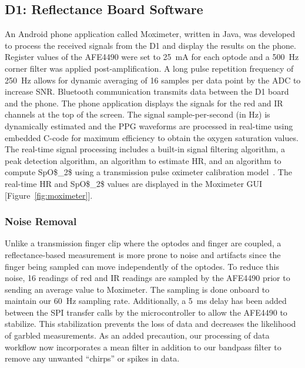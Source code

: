\subsection{D1: Reflectance Board Software}
An Android phone application called Moximeter, written in Java, was developed to process the received signals from the D1 and display the results on the phone. Register values of the \ac{AFE4490} were set to 25~mA for each optode and a 500~Hz corner filter was applied post-amplification. A long pulse repetition frequency of 250~Hz allows for dynamic averaging of 16 samples per data point by the \ac{ADC} to increase \ac{SNR}. Bluetooth communication transmits data between the D1 board and the phone. The phone application displays the signals for the red and \ac{IR} channels at the top of the screen. The signal sample-per-second (in Hz) is dynamically estimated and the \ac{PPG} waveforms are processed in real-time using embedded C-code for maximum efficiency to obtain the oxygen saturation values. The real-time signal processing includes a built-in signal filtering algorithm, a peak detection algorithm, an algorithm to estimate \ac{HR}, and an algorithm to compute \ac{SpO$_2$} using a transmission pulse oximeter calibration model~\cite{Bailey2008}. The real-time \ac{HR} and \ac{SpO$_2$} values are displayed in the Moximeter \ac{GUI} [Figure~\ref{fig:moximeter}]. 
    
\subsubsection{Noise Removal}
Unlike a transmission finger clip where the optodes and finger are coupled, a reflectance-based measurement is more prone to noise and artifacts since the finger being sampled can move independently of the optodes. To reduce this noise, 16 readings of red and \ac{IR} readings are sampled by the \ac{AFE4490} prior to sending an average value to Moximeter. The sampling is done onboard to maintain our 60~Hz sampling rate. Additionally, a 5~ms delay has been added between the \ac{SPI} transfer calls by the microcontroller to allow the \ac{AFE4490} to stabilize. This stabilization prevents the loss of data and decreases the likelihood of garbled measurements. As an added precaution, our processing of data workflow now incorporates a mean filter in addition to our bandpass filter to remove any unwanted ``chirps'' or spikes in data. 
        
